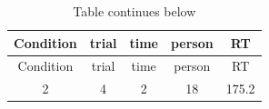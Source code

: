 \documentclass[]{article}
\theoremstyle{definition}
\theoremstyle{definition}
\theoremstyle{definition}
\theoremstyle{remark}
\begin{document}
\begin{longtable}[]{@{}ccccc@{}}
\caption{Table continues below}\tabularnewline
\toprule
\begin{minipage}[b]{0.14\columnwidth}\centering\strut
Condition\strut
\end{minipage} & \begin{minipage}[b]{0.10\columnwidth}\centering\strut
trial\strut
\end{minipage} & \begin{minipage}[b]{0.08\columnwidth}\centering\strut
time\strut
\end{minipage} & \begin{minipage}[b]{0.11\columnwidth}\centering\strut
person\strut
\end{minipage} & \begin{minipage}[b]{0.11\columnwidth}\centering\strut
RT\strut
\end{minipage}\tabularnewline
\midrule
\endfirsthead
\toprule
\begin{minipage}[b]{0.14\columnwidth}\centering\strut
Condition\strut
\end{minipage} & \begin{minipage}[b]{0.10\columnwidth}\centering\strut
trial\strut
\end{minipage} & \begin{minipage}[b]{0.08\columnwidth}\centering\strut
time\strut
\end{minipage} & \begin{minipage}[b]{0.11\columnwidth}\centering\strut
person\strut
\end{minipage} & \begin{minipage}[b]{0.11\columnwidth}\centering\strut
RT\strut
\end{minipage}\tabularnewline
\midrule
\endhead
\begin{minipage}[t]{0.14\columnwidth}\centering\strut
2\strut
\end{minipage} & \begin{minipage}[t]{0.10\columnwidth}\centering\strut
4\strut
\end{minipage} & \begin{minipage}[t]{0.08\columnwidth}\centering\strut
2\strut
\end{minipage} & \begin{minipage}[t]{0.11\columnwidth}\centering\strut
18\strut
\end{minipage} & \begin{minipage}[t]{0.11\columnwidth}\centering\strut
175.2\strut
\end{minipage}\tabularnewline

\end{longtable}
\end{document}
